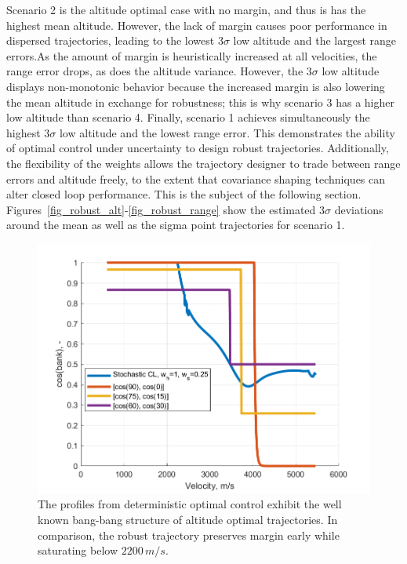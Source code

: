 \documentclass[letterpaper, paper,11pt]{AAS}
\begin{document}
Scenario 2 is the altitude optimal case with no margin, and thus is has the highest mean altitude. However, the lack of margin causes poor performance in dispersed trajectories, leading to the lowest $ 3\sigma $ low altitude and the largest range errors.As the amount of margin is heuristically increased at all velocities, the range error drops, as does the altitude variance. However, the $ 3\sigma $ low altitude displays non-monotonic behavior because the increased margin is also lowering the mean altitude in exchange for robustness; this is why scenario 3 has a higher low altitude than scenario 4. Finally, scenario 1 achieves simultaneously the highest $ 3\sigma $ low altitude and the lowest range error. This demonstrates the ability of optimal control under uncertainty to design robust trajectories. Additionally, the flexibility of the weights allows the trajectory designer to trade between range errors and altitude freely, to the extent that covariance shaping techniques can alter closed loop performance. This is the subject of the following section. Figures~\ref{fig_robust_alt}-\ref{fig_robust_range} show the estimated $3\sigma$ deviations around the mean as well as the sigma point trajectories for scenario 1.
\begin{figure}[h!]
	\centering
	\includegraphics[width=1\textwidth]{ddp/matlab/ComparisonControl}
	\caption{The profiles from deterministic optimal control exhibit the well known bang-bang structure of altitude optimal trajectories. In comparison, the robust trajectory preserves margin early while saturating below $ 2200\, m/s $.}
	\label{fig_control_comparison}
\end{figure}
\end{document}
